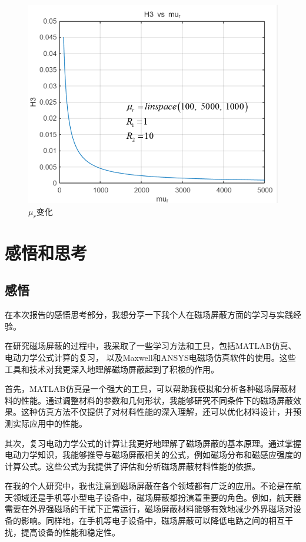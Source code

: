 \documentclass{article}
\begin{document}
            \begin{figure}[H]
              \centering
              \includegraphics[width=12cm]{img/8.png}
              \caption[]{$\mu_r$变化}
              \end{figure}
\section{感悟和思考}
\subsection{感悟}
在本次报告的感悟思考部分，我想分享一下我个人在磁场屏蔽方面的学习与实践经验。

在研究磁场屏蔽的过程中，我采取了一些学习方法和工具，包括MATLAB仿真、
电动力学公式计算的复习，
以及Maxwell和ANSYS电磁场仿真软件的使用。这些工具和技术对我更深入地理解磁场屏蔽起到了积极的作用。

首先，MATLAB仿真是一个强大的工具，可以帮助我模拟和分析各种磁场屏蔽材料的性能。通过调整材料的参数和几何形状，我能够研究不同条件下的磁场屏蔽效果。这种仿真方法不仅提供了对材料性能的深入理解，还可以优化材料设计，并预测实际应用中的性能。

其次，复习电动力学公式的计算让我更好地理解了磁场屏蔽的基本原理。通过掌握电动力学知识，我能够推导与磁场屏蔽相关的公式，例如磁场分布和磁感应强度的计算公式。这些公式为我提供了评估和分析磁场屏蔽材料性能的依据。

在我的个人研究中，我也注意到磁场屏蔽在各个领域都有广泛的应用。不论是在航天领域还是手机等小型电子设备中，磁场屏蔽都扮演着重要的角色。例如，航天器需要在外界强磁场的干扰下正常运行，磁场屏蔽材料能够有效地减少外界磁场对设备的影响。同样地，在手机等电子设备中，磁场屏蔽可以降低电路之间的相互干扰，提高设备的性能和稳定性。
\end{document}
